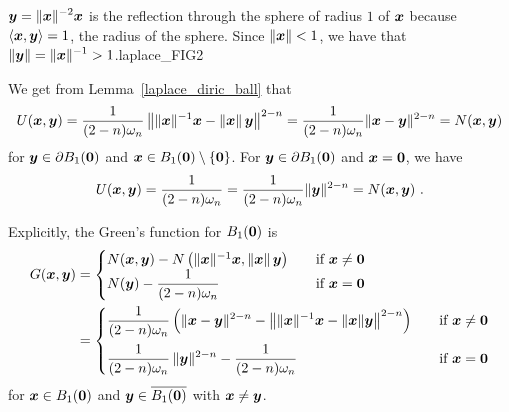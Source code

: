 {$\displaystyle {\bm{y}}= \|{\bm{x}}\|^{-2}{\bm{x}}$ is the reflection through the
sphere of radius $1$ of ${\bm{x}}$ because $\left\langle{{\bm{x}}} , {{\bm{y}}}\right\rangle =1$,
the radius of the sphere.  Since $\|{\bm{x}}\|<1$, we have that
$\displaystyle \|{\bm{y}}\| = \|{\bm{x}}\|^{-1} >1$.}{laplace_FIG2}

We get from Lemma~\ref{laplace_diric_ball} that
\[
U({\bm{x}},{\bm{y}}) = \frac{1}{(2-n)\omega_n}
\left\| \|{\bm{x}}\|^{-1}{\bm{x}} - \|{\bm{x}}\|\,{\bm{y}}\right\|^{2-n}
= \frac{1}{(2-n)\omega_n} \|{\bm{x}}-{\bm{y}}\|^{2-n}
= N({\bm{x}},{\bm{y}})
\]
for ${\bm{y}} \in \partial B_1({\bm{0}})$ and
${\bm{x}} \in B_1({\bm{0}})\setminus \{{\bm{0}}\}$.  For
${\bm{y}} \in \partial B_1({\bm{0}})$ and ${\bm{x}} = {\bm{0}}$, we have
\[
U(\VEC{x},\VEC{y}) = \frac{1}{(2-n)\omega_n} 
= \frac{1}{(2-n)\omega_n} \|\VEC{y}\|^{2-n} = N(\VEC{x},\VEC{y}) \ .
\]

Explicitly, the Green's function for $B_1({\bm{0}})$ is
\begin{align*}
G({\bm{x}},{\bm{y}}) &=
\begin{cases}
N({\bm{x}},{\bm{y}}) -
N\left(\|{\bm{x}}\|^{-1} {\bm{x}},\|{\bm{x}}\|\,{\bm{y}}\right) & \quad
\text{if} \ {\bm{x}} \neq {\bm{0}} \\
\displaystyle N({\bm{y}}) - \frac{1}{(2-n)\omega_n} & \quad \text{if}
\ {\bm{x}} = {\bm{0}}
\end{cases} \\
&= \begin{cases}
\displaystyle \frac{1}{(2-n)\omega_n} \left( \|{\bm{x}}-{\bm{y}}\|^{2-n}
-\left\| \|{\bm{x}}\|^{-1}{\bm{x}} - \|{\bm{x}}\|{\bm{y}}\right\|^{2-n}
\right) & \quad \text{if} \ {\bm{x}} \neq {\bm{0}} \\[1em]
\displaystyle \frac{1}{(2-n)\omega_n}\,\|{\bm{y}}\|^{2-n} -
\frac{1}{(2-n)\omega_n} & \quad \text{if} \ {\bm{x}} = {\bm{0}}
\end{cases}
\end{align*}
for ${\bm{x}} \in B_1({\bm{0}})$ and ${\bm{y}} \in \overline{B_1({\bm{0}})}$
with ${\bm{x}} \neq {\bm{y}}$.  

